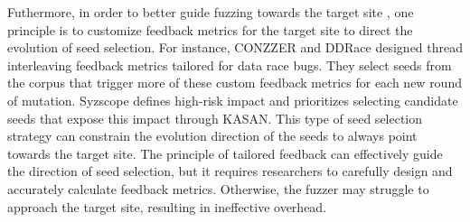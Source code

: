 Futhermore, in order to better guide fuzzing towards the target site , one principle is to customize feedback metrics for the target site to direct the evolution of seed selection. For instance, CONZZER \cite{CONZZER2022context} and DDRace \cite{Yuan2023DDRace} designed thread interleaving feedback metrics tailored for data race bugs. They select seeds from the corpus that trigger more of these custom feedback metrics for each new round of mutation. Syzscope \cite{zou2022syzscope} defines high-risk impact and prioritizes selecting candidate seeds that expose this impact through KASAN. This type of seed selection strategy can constrain the evolution direction of the seeds to always point towards the target site. The principle of tailored feedback can effectively guide the direction of seed selection, but it requires researchers to carefully design and accurately calculate feedback metrics. Otherwise, the fuzzer may struggle to approach the target site, resulting in ineffective overhead.



